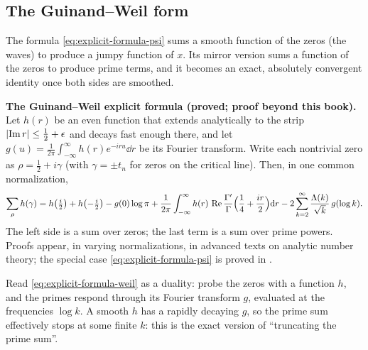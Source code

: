 \subsection{The Guinand--Weil form}

The formula \cref{eq:explicit-formula-psi} sums a smooth function of the zeros (the waves) to produce a jumpy function of $x$. Its mirror version sums a function of the zeros to produce prime terms, and it becomes an exact, absolutely convergent identity once both sides are smoothed.

\begin{beyond}
\textbf{The Guinand--Weil explicit formula (proved; proof beyond this book).} Let $h(r)$ be an even function that extends analytically to the strip $\left\lvert \operatorname{Im} r\right\rvert\le\tfrac12+\epsilon$ and decays fast enough there, and let $g(u)=\frac{1}{2\pi}\int_{-\infty}^{\infty}h(r)e^{-iru}\dd r$ be its Fourier transform. Write each nontrivial zero as $\rho=\tfrac12+i\gamma$ (with $\gamma=\pm t_n$ for zeros on the critical line). Then, in one common normalization,
\begin{equation}
\sum_{\rho}h(\gamma)=h\bigl(\tfrac{i}{2}\bigr)+h\bigl(-\tfrac{i}{2}\bigr)-g(0)\log\pi+\frac{1}{2\pi}\int_{-\infty}^{\infty}h(r)\,\operatorname{Re}\frac{\Gamma'}{\Gamma}\Bigl(\frac14+\frac{ir}{2}\Bigr)\mathrm{d} r-2\sum_{k=2}^{\infty}\frac{\Lambda(k)}{\sqrt k}\,g(\log k).
\label{eq:explicit-formula-weil}
\end{equation}
The left side is a sum over zeros; the last term is a sum over prime powers. Proofs appear, in varying normalizations, in advanced texts on analytic number theory; the special case \cref{eq:explicit-formula-psi} is proved in \cite{davenport}.
\end{beyond}

Read \cref{eq:explicit-formula-weil} as a duality: probe the zeros with a function $h$, and the primes respond through its Fourier transform $g$, evaluated at the frequencies $\log k$. A smooth $h$ has a rapidly decaying $g$, so the prime sum effectively stops at some finite $k$: this is the exact version of ``truncating the prime sum''.

